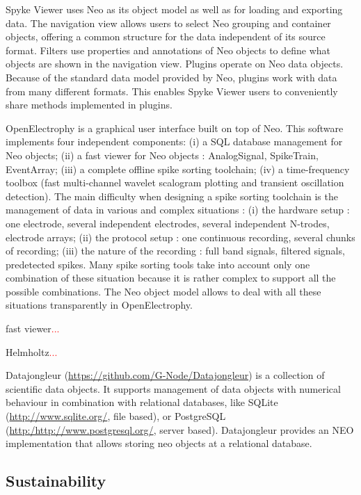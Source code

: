 \documentclass{frontiers}
\newcommand{\missing}[1]{\textcolor{red}{#1}}
\begin{document}
Spyke Viewer uses Neo as its object model as well as for loading and exporting data. 
The navigation view allows users to select Neo grouping and container objects, offering a common structure for the data independent of its source format.
Filters use properties and annotations of Neo objects to define what objects are shown in the navigation view.
Plugins operate on Neo data objects. Because of the standard data model provided by Neo, plugins work with data from many different formats. This enables Spyke Viewer users to conveniently share methods implemented in plugins.

OpenElectrophy \citep{Garcia2009} is a graphical user interface built on top of Neo. This software implements four independent components:
   (i) a SQL database management for Neo objects;
   (ii) a fast viewer for Neo objects : AnalogSignal, SpikeTrain, EventArray;
   (iii) a complete offline spike sorting toolchain;
   (iv) a time-frequency toolbox (fast multi-channel wavelet scalogram plotting and transient oscillation detection).
The main difficulty when designing a spike sorting toolchain is the management of data in various and complex situations : 
   (i) the hardware setup : one electrode, several independent electrodes, several independent N-trodes, electrode arrays;
   (ii) the protocol setup : one continuous recording, several chunks of recording;
   (iii) the nature of the recording : full band signals, filtered signals, predetected spikes.
Many spike sorting tools take into account only one combination of these situation because it is rather complex to support all the possible combinations. The Neo object model allows to deal with all these situations transparently in OpenElectrophy.


fast viewer\missing{...}

Helmholtz\missing{...}

Datajongleur (\url{https://github.com/G-Node/Datajongleur}) is a collection of
scientific data objects. It supports management of data objects with numerical
behaviour in combination with relational databases, like SQLite
(\url{http://www.sqlite.org/}, file based), or PostgreSQL
(\url{http:/http://www.postgresql.org/}, server based). Datajongleur provides
an NEO implementation that allows storing neo objects at a relational database.


\subsection{Sustainability}
\end{document}
